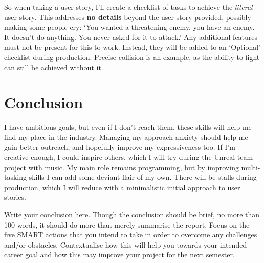 \documentclass{scrartcl}
\begin{document}
So when taking a user story, I'll create a checklist of tasks to achieve the \textit{literal} user story. This addresses \textbf{no details} beyond the user story provided, possibly making some people cry: `You wanted a threatening enemy, you have an enemy. It doesn't do anything. You never asked for it to attack.' Any additional features must not be present for this to work. Instead, they will be added to an `Optional' checklist during production. Precise collision is an example, as the ability to fight can still be achieved without it.

\section{Conclusion}

I have ambitious goals, but even if I don't reach them, these skills will help me find my place in the industry. Managing my approach anxiety should help me gain better outreach, and hopefully improve my expressiveness too. If I'm creative enough, I could inspire others, which I will try during the Unreal team project with music. My main role remains programming, but by improving multi-tasking skills I can add some deviant flair of my own. There will be stalls during production, which I will reduce with a minimalistic initial approach to user stories.

Write your conclusion here. Though the conclusion should be brief, no more than 100 words, it should do more than merely summarise the report. Focus on the five SMART actions that you intend to take in order to overcome any challenges and/or obstacles. Contextualise how this will help you towards your intended career goal and how this may improve your project for the next semester.



\end{document}
